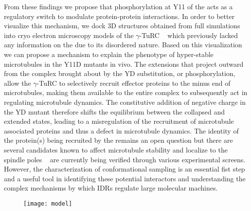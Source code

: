 \begin{figure}
\centering     %
{}
\label{fig:wells}
\end{figure}

From these findings we propose that phosphorylation at Y11 of the \gct acts as a regulatory switch to modulate protein-protein interactions. In order to better visualize this mechanism, we dock 3D structures obtained from full \tub simulations into cryo electron microscopy models of the $\gamma$-TuRC ~\cite{kollman2015ring}  which previously lacked any information on the \gct due to its disordered nature. Based on this visualization we can propose a mechanism to explain the phenotype of hyper-stable microtubules in the Y11D mutants in vivo. The extensions that project outward from the complex brought about by the YD substitution, or phosphorylation, allow the $\gamma$-TuRC to selectively recruit effector proteins to the minus end of microtubules, making them available to the entire complex to subsequently act in regulating microtubule dynamics. The constitutive addition of negative charge in the YD mutant therefore shifts the equilibrium between the collapsed and extended states, leading to a misregulation of the recruitment of microtubule associated proteins and thus a defect in microtubule dynamics. The identity of the  protein(s) being recruited by the \gct remains an open question but there are several candidates known to affect microtubule stability and localize to the spindle poles ~\cite{cuschieri2006gamma} are currently being verified through various experimental screens. However, the characterization of \gct conformational sampling  is an essential fist step and a useful tool in identifying these potential interactors and understanding the complex mechanisms by which IDRs regulate large molecular machines.

\begin{figure}
\centering
\texttt{[image: model]}
\label{fig:turc}
\end{figure}
